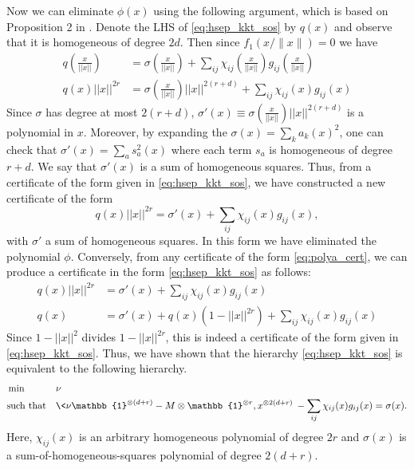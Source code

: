 \documentclass[aps,pra,notitlepage,preprintnumbers,11pt,tightenlines]{revtex4-1}
\newcommand{\ident}{\mathbb{1}}
\newcommand{\ot}{\otimes}
\begin{document}
Now we can eliminate $\phi(x)$ using the following
argument, which is based on Proposition 2
in \cite{deklerk:2005}. Denote the LHS of
\eqref{eq:hsep_kkt_sos} by $q(x)$ and observe that it is homogeneous of degree
$2d$. 
Then since $f_1(x/\|x\|)=0$ we have
\begin{align*}
  q\left( \frac{x}{||x||}\right) &= \sigma\left(\frac{x}{||x||}\right)
  + \sum_{ij} \chi_{ij}\left(\frac{x}{||x||}\right)
  g_{ij}\left(\frac{x}{||x||}\right) \\
  q(x) ||x||^{2r} &= \sigma\left(\frac{x}{||x||}\right) ||x||^{2(r+d)} +
  \sum_{ij} \chi_{ij}(x) g_{ij}(x)
\end{align*}
Since $\sigma$ has degree at most $2(r+d)$, 
$\sigma'(x) \equiv \sigma\left(\frac{x}{||x||}\right) ||x||^{2(r+d)}$ is a polynomial
in $x$. Moreover, by expanding the $\sigma(x) = \sum_k a_k(x)^2$, one
can check that $\sigma'(x) = \sum_a s_{a}^{2}(x)$ where each term $s_a$ is homogeneous
of degree $r + d$. We say that $\sigma'(x)$ is a sum of homogeneous
squares. Thus, from a certificate of the form given in \eqref{eq:hsep_kkt_sos}, we have constructed a new
certificate of the form
\begin{equation}
  q(x)||x||^{2r}  = \sigma'(x) + \sum_{ij} \chi_{ij}(x) g_{ij}(x),
  \label{eq:polya_cert}
\end{equation}
with $\sigma'$ a sum of homogeneous squares. In this form we have
eliminated the polynomial $\phi$. Conversely, from any certificate of the form
\eqref{eq:polya_cert}, we can produce a certificate in the form \eqref{eq:hsep_kkt_sos}
as follows:
\begin{align*}
  q(x)||x||^{2r}  &= \sigma'(x) + \sum_{ij} \chi_{ij}(x) g_{ij}(x)
  \\
  q(x) &= \sigma'(x) + q(x)(1 - ||x||^{2r}) + \sum_{ij} \chi_{ij}(x)
  g_{ij}(x)
\end{align*}
Since $1 - ||x||^2$ divides $1 - ||x||^{2r}$, this is indeed a
certificate of the form given in \eqref{eq:hsep_kkt_sos}.
Thus, we have shown that the hierarchy \eqref{eq:hsep_kkt_sos} is
equivalent to the following hierarchy.
\begin{equation}
  \label{eq:hsep_kkt_polya}
  \begin{aligned} 
  &\min && \nu \\
  &\text{such that} && 
\< \nu \ident^{\otimes(d+r)} -M \otimes
  \ident^{\otimes r}, x^{\ot 2(d+r)}\>- \sum_{ij}
  \chi_{ij}(x) g_{ij}(x) = \sigma(x) . \\
\end{aligned}
\end{equation}
Here, $\chi_{ij}(x)$ is an arbitrary homogeneous polynomial of degree
$2r$ and $\sigma(x)$ is a sum-of-homogeneous-squares polynomial of
degree $2(d+r)$. 
\end{document}
